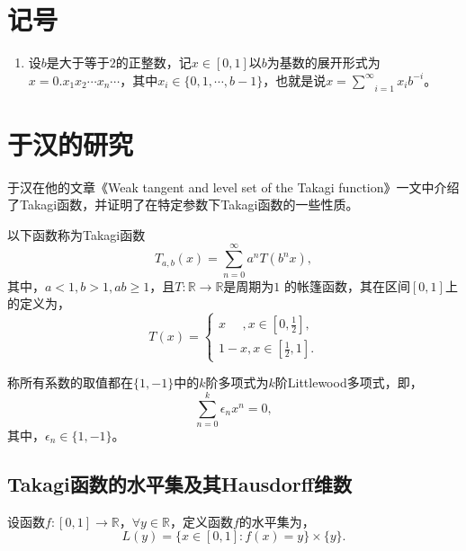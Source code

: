 \cleardoublepage

\section{记号}
\begin{enumerate}
      \item 设$b$是大于等于$2$的正整数，记$x\in[0,1]$以$b$为基数的展开形式为$x=0.x_1x_2\cdots x_n\cdots$，其中$x_i\in\{0,1,\cdots,b-1\}$，也就是说$x=\underset{i=1}{\overset{\infty}{\sum}}x_ib^{-i}$。
\end{enumerate}



\section{于汉的研究}

于汉在他的文章《Weak tangent and level set of the Takagi function》一文中介绍了Takagi函数，并证明了在特定参数下Takagi函数的一些性质。

\begin{definition}[Takagi 函数]
        以下函数称为Takagi函数
        $$
            T_{a,b}(x)=\sum_{n=0}^\infty a^nT(b^nx),
        $$
        其中，$a<1,b>1,ab\ge1$，且$T:\mathbb{R}\rightarrow\mathbb{R}$是周期为$1$ 的帐篷函数，其在区间$[0,1]$上的定义为，
        $$
            T(x)=
            \begin{cases}
                x~~~~~~,x\in[0,\frac{1}{2}],\\
                1-x,x\in[\frac{1}{2},1].
            \end{cases}
        $$

        \begin{definition}[Littlewood多项式]
            称所有系数的取值都在$\{1,-1\}$中的$k$阶多项式为$k$阶Littlewood多项式，即，
            $$
                \sum_{n=0}^k\epsilon_nx^n=0,
            $$
            其中，$\epsilon_n\in\{1,-1\}$。
        \end{definition}
\end{definition}

\subsection{Takagi函数的水平集及其Hausdorff维数}

\begin{definition}[水平集]
    设函数$f:[0,1]\rightarrow\mathbb{R}$，$\forall y \in\mathbb{R}$，定义函数$f$的水平集为，
    $$
        L(y)=\{x\in[0,1]:f(x)=y\}\times\{y\}.
    $$
\end{definition}


